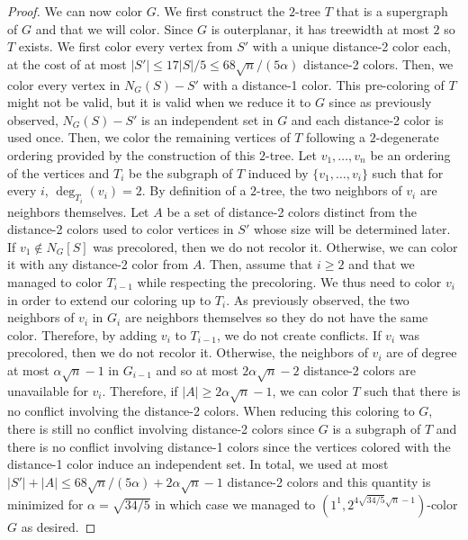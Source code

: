 \documentclass[10pt,a4paper]{amsart}
\newcommand{\colo}[2]{(1^{#1}, 2^{#2})}
\begin{document}
\begin{proof}
    We can now color $G$. We first construct the $2$-tree $T$ that is a supergraph of $G$ and that we will color. Since $G$ is outerplanar, it has treewidth at most $2$ so $T$ exists. We first color every vertex from $S'$ with a unique distance-2 color each, at the cost of at most $|S'| \leq 17|S|/5 \le 68\sqrt{n}/(5\alpha)$ distance-2 colors. Then, we color every vertex in $N_G(S) - S'$ with a distance-1 color. This pre-coloring of $T$ might not be valid, but it is valid when we reduce it to $G$ since as previously observed, $N_G(S) - S'$ is an independent set in $G$ and each distance-2 color is used once. Then, we color the remaining vertices of $T$ following a $2$-degenerate ordering provided by the construction of this $2$-tree. 
    Let $v_1, \dots, v_n$ be an ordering of the vertices and $T_i$ be the subgraph of $T$ induced by $\{v_1, \dots, v_i\}$ such that for every $i$, $\deg_{T_i}(v_i) = 2$. By definition of a $2$-tree, the two neighbors of $v_i$ are neighbors themselves. Let $A$ be a set of distance-2 colors distinct from the distance-2 colors used to color vertices in $S'$ whose size will be determined later. If $v_1 \not\in N_G[S]$ was precolored, then we do not recolor it. Otherwise, we can color it with any distance-2 color from $A$. 
    Then, assume that $i \ge 2$ and that we managed to color $T_{i - 1}$ while respecting the precoloring. We thus need to color $v_i$ in order to extend our coloring up to $T_i$.
    As previously observed, the two neighbors of $v_i$ in $G_i$ are neighbors themselves so they do not have the same color. Therefore, by adding $v_i$ to $T_{i - 1}$, we do not create conflicts. If $v_i$ was precolored, then we do not recolor it. Otherwise, the neighbors of $v_i$ are of degree at most $\alpha \sqrt{n} - 1$ in $G_{i - 1}$ and so at most $2\alpha \sqrt{n} - 2$ distance-2 colors are unavailable for $v_i$. Therefore, if $|A| \geq 2\alpha \sqrt{n} - 1$, we can color $T$ such that there is no conflict involving the distance-2 colors. When reducing this coloring to $G$, there is still no conflict involving distance-2 colors since $G$ is a subgraph of $T$ and there is no conflict involving distance-1 colors since the vertices colored with the distance-1 color induce an independent set. In total, we used at most $|S'| + |A| \le 68\sqrt{n}/(5\alpha) +  2\alpha \sqrt{n} - 1$ distance-2 colors and this quantity is minimized for $\alpha = \sqrt{34/5}$ in which case we managed to $\colo{1}{4\sqrt{34/5}\sqrt{n} - 1}$-color $G$ as desired.
\end{proof}
\end{document}
